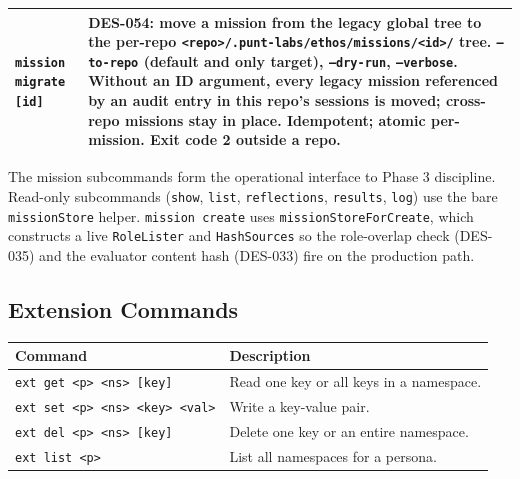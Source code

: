 \documentclass[a4paper,10pt]{article}
\newcommand{\cmd}[1]{\texttt{#1}}
\newcommand{\fpath}[1]{\texttt{#1}}
\begin{document}
\begin{center}
\begin{tabular}{@{}lp{6.5cm}@{}}
\cmd{mission migrate [id]}         & DES-054: move a mission from
                                       the legacy global tree to the
                                       per-repo
                                       \fpath{<repo>/.punt-labs/ethos/missions/<id>/}
                                       tree.  \cmd{--to-repo} (default
                                       and only target),
                                       \cmd{--dry-run},
                                       \cmd{--verbose}.
                                       Without an ID argument, every
                                       legacy mission referenced by an
                                       audit entry in this repo's
                                       sessions is moved; cross-repo
                                       missions stay in place.
                                       Idempotent; atomic per-mission.
                                       Exit code 2 outside a repo. \\
\bottomrule
\end{tabular}
\end{center}

The mission subcommands form the operational interface to Phase 3
discipline.  Read-only subcommands (\cmd{show}, \cmd{list},
\cmd{reflections}, \cmd{results}, \cmd{log}) use the bare
\texttt{missionStore} helper.  \cmd{mission create} uses
\texttt{missionStoreForCreate}, which constructs a live
\texttt{RoleLister} and \texttt{HashSources} so the role-overlap
check (DES-035) and the evaluator content hash (DES-033) fire on
the production path.

\subsection{Extension Commands}

\begin{center}
\begin{tabular}{@{}lp{6.5cm}@{}}
\toprule
\textbf{Command} & \textbf{Description} \\
\midrule
\cmd{ext get <p> <ns> [key]}       & Read one key or all keys in a
                                     namespace. \\
\cmd{ext set <p> <ns> <key> <val>} & Write a key-value pair. \\
\cmd{ext del <p> <ns> [key]}       & Delete one key or an entire
                                     namespace. \\
\cmd{ext list <p>}                 & List all namespaces for a
                                     persona. \\
\bottomrule
\end{tabular}
\end{center}
\end{document}

